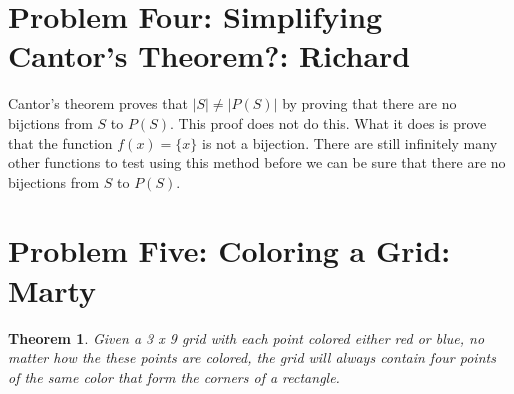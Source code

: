 \documentclass[10pt,letter]{article}
\newtheorem*{thm}{Theorem}
\begin{document}
\section*{Problem Four: Simplifying Cantor's Theorem?: Richard}
Cantor's theorem proves that $|S| \not = |P(S)|$ by proving that there are no bijctions from $S$ to $P(S)$. This proof does not do this. What it does is prove that the function $f(x) = \{x\}$ is not a bijection. There are still infinitely many other functions to test using this method before we can be sure that there are no bijections from $S$ to $P(S)$.

\section*{Problem Five: Coloring a Grid: Marty}
\begin{thm} Given a 3 x 9 grid with each point colored either red or blue, no matter how the these points are colored, the grid will always contain four points of the same color that form the corners of a rectangle. 
\end{thm}
\end{document}
